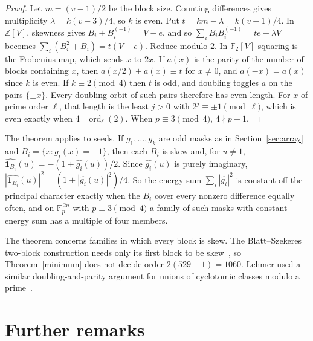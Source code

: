 \documentclass[11pt]{article}
\theoremstyle{remark}
\newcommand{\F}{\mathbb F}
\newcommand{\one}{\mathbf 1}
\begin{document}
\begin{proof}
Let $m=(v-1)/2$ be the block size. Counting differences gives multiplicity $\lambda=k(v-3)/4$, so $k$ is even. Put $t=km-\lambda=k(v+1)/4$. In $\mathbb Z[V]$, skewness gives $B_i+B_i^{(-1)}=V-e$, and so $\sum_iB_iB_i^{(-1)}=te+\lambda V$ becomes $\sum_i(B_i^2+B_i)=t(V-e)$. Reduce modulo $2$. In $\F_2[V]$ squaring is the Frobenius map, which sends $x$ to $2x$. If $a(x)$ is the parity of the number of blocks containing $x$, then $a(x/2)+a(x)\equiv t$ for $x\ne0$, and $a(-x)=a(x)$ since $k$ is even. If $k\equiv2\pmod4$ then $t$ is odd, and doubling toggles $a$ on the pairs $\{\pm x\}$. Every doubling orbit of such pairs therefore has even length. For $x$ of prime order $\ell$, that length is the least $j>0$ with $2^j\equiv\pm1\pmod\ell$, which is even exactly when $4\mid\operatorname{ord}_\ell(2)$. When $p\equiv3\pmod4$, $4\nmid p-1$.
\end{proof}

The theorem applies to seeds. If $g_1,\dots,g_k$ are odd masks as in Section~\ref{sec:array} and $B_i=\{x:g_i(x)=-1\}$, then each $B_i$ is skew and, for $u\ne1$, $\widehat{\one_{B_i}}(u)=-(1+\widehat{g_i}(u))/2$. Since $\widehat{g_i}(u)$ is purely imaginary, $|\widehat{\one_{B_i}}(u)|^2=(1+|\widehat{g_i}(u)|^2)/4$. So the energy sum $\sum_i|\widehat{g_i}|^2$ is constant off the principal character exactly when the $B_i$ cover every nonzero difference equally often, and on $\F_p^{\,2n}$ with $p\equiv3\pmod4$ a family of such masks with constant energy sum has a multiple of four members.

The theorem concerns families in which every block is skew. The Blatt--Szekeres two-block construction needs only its first block to be skew~\cite{BS}, so Theorem~\ref{minimum} does not decide order $2(529+1)=1060$. Lehmer used a similar doubling-and-parity argument for unions of cyclotomic classes modulo a prime~\cite{Lehmer}.

\section{Further remarks}
\end{document}
